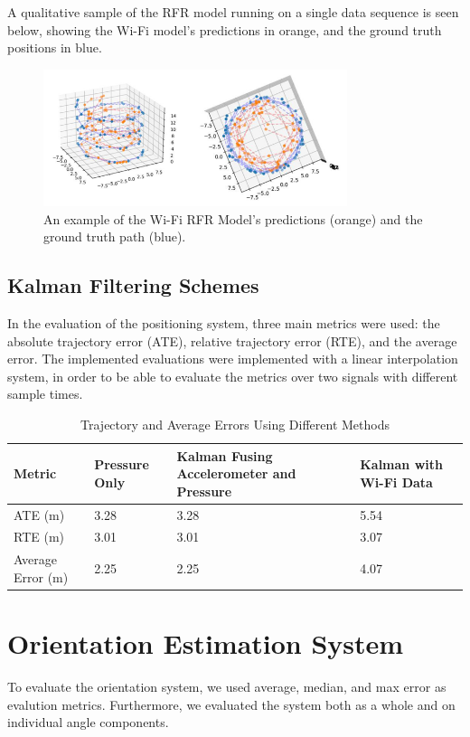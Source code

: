 A qualitative sample of the RFR model running on a single data sequence is seen below, showing the Wi-Fi model's predictions in orange, and the ground truth positions in blue.
\begin{figure}[h] 
	\centering \includegraphics[height=4cm]{./images/wifirf.png}
	\caption{An example of the Wi-Fi RFR Model's predictions (orange) and  the ground truth path (blue).}
\end{figure}

\subsection{Kalman Filtering Schemes}
In the evaluation of the positioning system, three main metrics were used: the absolute trajectory error (ATE), relative trajectory error (RTE), and the average error. \cite{rtabmap, yan_2019_ronin} The implemented evaluations were implemented with a linear interpolation system, in order to be able to evaluate the metrics over two signals with different sample times.

\begin{table}[h!]
\centering
\caption{Trajectory and Average Errors Using Different Methods}
\label{tab:trajectory_errors}
\setlength{\tabcolsep}{3pt} %
\small %
\begin{tabularx}{\columnwidth}{l X X X} %
\toprule
\textbf{Metric} & \textbf{Pressure Only} & 
\textbf{\centering Kalman Fusing Accelerometer and Pressure} & 
\textbf{Kalman with Wi-Fi Data} \\ 
\midrule
ATE (m) & 3.28 & 3.28 & 5.54 \\
RTE (m) & 3.01 & 3.01 & 3.07 \\
Average Error (m)             & 2.25 & 2.25 & 4.07 \\
\bottomrule
\end{tabularx}
\end{table}

\section{Orientation Estimation System}
To evaluate the orientation system, we used average, median, and max error as evalution metrics. Furthermore, we evaluated the system both as a whole and on individual angle components.

